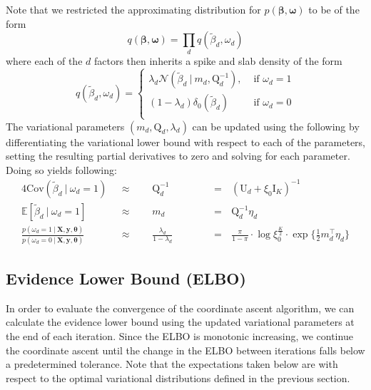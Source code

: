 \documentclass[twoside,11pt]{article}
\newcommand\given[1][]{\:#1\vert\:}
\newcommand{\transpose}[1]{#1^{\intercal}}
\newcommand{\boldbeta}{\boldsymbol\beta}
\newcommand{\E}{\mathbb{E}}
\newcommand{\betad}{\tilde{\beta}_d}
\newcommand{\umat}{\mathrm{U}}
\newcommand{\qmat}{\mathrm{Q}}
\newcommand{\pr}[1]{p \left( #1 \right)}
\begin{document}
Note that we restricted the approximating distribution for $\pr{\boldbeta, \boldsymbol\omega}$ to be of the form
$$ q \left( \boldbeta, \boldsymbol \omega\right) = \prod_{d} q \left( \betad, \omega_d \right) $$
where each of the $d$ factors then inherits a spike and slab density of the form
\[   
q \left( \betad, \omega_d \right) = 
\left\{
\begin{array}{ll}
      \lambda_d \mathcal{N} \left( \betad \given m_d, \qmat_d^{-1} \right),  & \textrm{ if } \omega_d = 1 \\
      (1 - \lambda_d) \delta_0 \left( \betad \right) & \textrm{ if } \omega_d = 0 \\
\end{array} 
\right. \]
The variational parameters $(m_d, \qmat_d, \lambda_d)$ can be updated using the following by differentiating the variational lower bound with respect to each of the parameters, setting the resulting partial derivatives to zero and solving for each parameter. Doing so yields following:
\setlength{\jot}{10pt}
\begin{alignat}{4}
  \mathrm{Cov}(\betad \given \omega_d = 1) \textrm{ } &\approx \textrm{ }&& \qmat_d^{-1} &&\textrm{ } & &= \textrm{ } \left(\umat_d + \xi_0 \mathrm{I}_K\right)^{-1} \label{eq:var_betad}\\
  \E [ \betad \given \omega_d = 1]  \textrm{ }&\approx \textrm{ } && m_d &&\textrm{ }& &= \textrm{ } \qmat_d^{-1} \eta_d  \label{eq:e_betad}\\
  \frac{\pr{\omega_d = 1\given \mathbf{X}, \mathbf{y}, \boldsymbol\theta}}{\pr{\omega_d = 0 \given \mathbf{X}, \mathbf{y}, \boldsymbol\theta}} \textrm{ } &\approx \textrm{ } && \frac{\lambda_d}{1-\lambda_d}&& \textrm{ }& &= \textrm{ } \frac{\pi}{1-\pi} \cdot \log \xi_0^{\frac{K}{2}} \cdot \exp\Big\{\frac{1}{2}\transpose{m_d}\eta_d\Big\} \label{eq:logodds_lambda}
\end{alignat}



\newpage

\subsection{Evidence Lower Bound (ELBO)}
In order to evaluate the convergence of the coordinate ascent algorithm, we can calculate the evidence lower bound using the updated variational parameters at the end of each iteration. Since the ELBO is monotonic increasing, we continue the coordinate ascent until the change in the ELBO between iterations falls below a predetermined tolerance. Note that the expectations taken below are with respect to the optimal variational distributions defined in the previous section.
\end{document}
